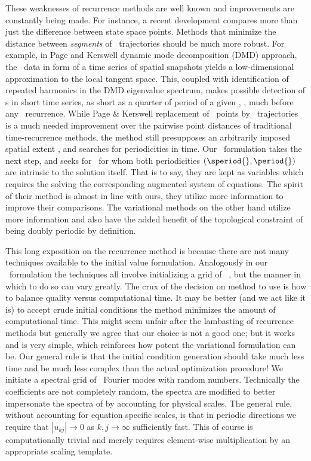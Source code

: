 These weaknesses of recurrence methods are well known
and improvements are constantly being made.
For instance, a recent development compares
more than just the difference between state space points.
Methods that minimize the distance between \emph{segments} of \statesp\
trajectories should be much more robust.
For example, in Page and Kerswell dynamic mode decomposition
(DMD)\rf{Schmid10,Schmid11} approach, the \spt\ data in form of a time
series of spatial snapshots yields a low-dimensional approximation to the
local tangent space. This, coupled with identification of repeated
harmonics in the DMD eigenvalue spectrum, makes possible detection of \po
s in short time series, as short as a quarter of period of a given \po,
\ie, much before any \statesp\ recurrence.
While Page \& Kerswell replacement of \statesp\ points by \statesp\
trajectories is a much needed improvement over the pairwise point
distances of traditional time-recurrence methods, the method still
presupposes an arbitrarily imposed spatial extent \speriod{}, and searches
for periodicities \period{} in time. Our \spt\ formulation takes the next
step, and seeks for \twots\ for whom both periodicities
$(\speriod{},\period{})$ are intrinsic to the solution itself. That is to say,
they are kept as variables which requires the solving
the corresponding augmented system of equations. The spirit of
their method is almost in line with ours,
they utilize more information to improve their comparisons.
The variational methods on the other hand
utilize more information and also
have the added benefit of the topological constraint of being
doubly periodic by definition.

This long exposition on the recurrence method is
because there are not many techniques available
to the initial value formulation. Analogously
in our \spt\
formulation the techniques all involve
initializing a grid of \spt\ \Fcs, but
the manner in which to do so can vary greatly.
The crux of the decision on method to use
is how to balance quality
versus computational time.
It may be better (and we act like it is)
to accept crude initial conditions
the method minimizes the amount of computational time.
This might seem unfair after the
lambasting of recurrence methods but generally we agree that
our choice is not a good one; but it works and is very simple,
which reinforces how potent the variational formulation can be.
Our general rule is that
the initial condition generation should take much less time
and be much less complex than the actual optimization procedure!
We initiate a spectral grid of \spt\ Fourier modes
with random numbers. Technically the
coefficients are not completely random,
the spectra are modified to better impersonate
the spectra of \twots by accounting for
physical scales.
The general rule, without accounting for
equation specific scales, is that in
periodic directions we require that
$|u_{kj} |\to 0$ as $k,j \to \infty$ sufficiently fast.
This of course
is computationally trivial and merely
requires element-wise multiplication by
an appropriate scaling template.

